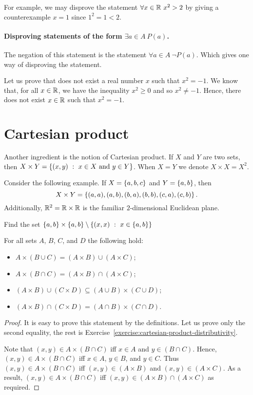 For example, we may disprove the statement $\forall x \in \mathbb{R} \ x^2 > 2$ by
giving a counterexample $x = 1$ since $1^2 = 1 < 2$.

\paragraph{Disproving statements of the form $\exists a \in A \ P(a)$.}
The negation of this statement is the statement $\forall a \in A \ \lnot P(a)$.
Which gives one way of disproving the statement.

Let us prove that does not exist a real number $x$ such that $x^2 = -1$. We
know that, for all $x \in \mathbb{R}$, we have the inequality $x^2 \ge 0$ and so $x^2
\neq -1$. Hence, there does not exist $x \in \mathbb{R}$ such that $x^2 = -1$.

\section{Cartesian product}
Another ingredient is the notion of Cartesian product. If $X$ and $Y$ are two
sets, then $X \times Y = \set[x \in X \text{ and } y \in Y]{(x, y)}$. When $X =
Y$ we denote $X \times X = X^2$.

Consider the following example. If $X = \set{a, b, c}$ and $Y = \set{a, b}$,
then $$X \times Y = \set{(a, a), (a, b), (b, a), (b, b), (c, a), (c, b)}.$$
Additionally, $\mathbb{R}^2 = \mathbb{R} \times \mathbb{R}$ is the familiar $2$-dimensional Euclidean
plane.

\begin{exercise}
  Find the set $\set{a, b} \times \set{a, b} \setminus
  \set[x \in \set{a, b}]{(x, x)}$
\end{exercise}

\begin{theorem}
\label{theorem:cartesian-product-distributivity}
  For all sets $A$, $B$, $C$, and $D$ the following hold:
  \begin{itemize}
    \item $A \times (B \cup C) = (A \times B) \cup (A \times C)$;
    \item $A \times (B \cap C) = (A \times B) \cap (A \times C)$;
    \item $(A \times B) \cup (C \times D) \subseteq
      (A \cup B) \times (C \cup D)$;
    \item $(A \times B) \cap (C \times D) =
      (A \cap B) \times (C \cap D)$.
  \end{itemize}
\end{theorem}
\begin{proof}
  It is easy to prove this statement by the definitions. Let us prove only the
  second equality, the rest is
  Exercise~\ref{exercise:cartesian-product-distributivity}.

  Note that $(x, y) \in A \times (B \cap C)$ iff $x \in A$ and
  $y \in (B \cap C)$.
  Hence, $(x, y) \in A \times (B \cap C)$ iff $x \in A$, $y \in B$, and
  $y \in C$. Thus $(x, y) \in A \times (B \cap C)$ iff
  $(x, y) \in (A \times B)$ and $(x, y) \in (A \times C)$. As a result,
  $(x, y) \in A \times (B \cap C)$ iff
  $(x, y) \in (A \times B) \cap (A \times C)$ as required.
\end{proof}


